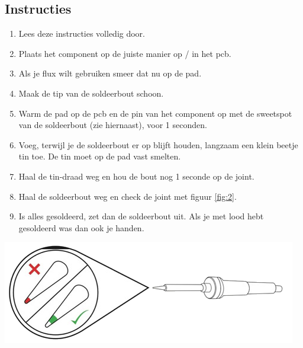 \documentclass{guide}
\begin{document}
\subsection{Instructies}
\begin{minipage}{.60\textwidth}
  \begin{enumerate}
  \item Lees deze instructies volledig door.
  \item Plaats het component op de juiste manier op / in het pcb.
  \item Als je flux wilt gebruiken smeer dat nu op de pad.
  \item Maak de tip van de soldeerbout schoon.
  \item Warm de pad op de pcb en de pin van het component op met de sweetspot van de soldeerbout (zie hiernaast), voor 1 seconden.
  \item Voeg, terwijl je de soldeerbout er op blijft houden, langzaam een klein beetje tin toe. De tin moet op de pad vast smelten.
  \item Haal de tin-draad weg en hou de bout nog 1 seconde op de joint.
  \item Haal de soldeerbout weg en check de joint met figuur \ref{fig:2}.
  \item Is alles gesoldeerd, zet dan de soldeerbout uit. Als je met lood hebt gesoldeerd was dan ook je handen.
  \end{enumerate}
\end{minipage}
\begin{minipage}{.40\textwidth}
  \includegraphics[width=\textwidth]{images/iron_hotspot.png}
  \label{wrap-fig:1}
\end{minipage}
\end{document}
